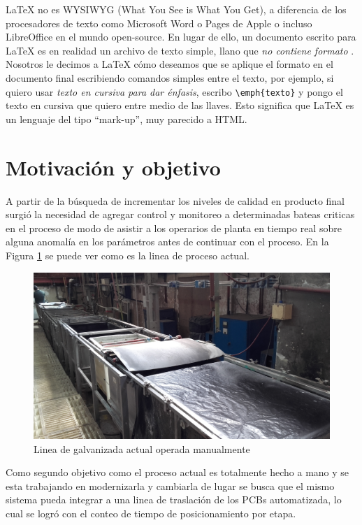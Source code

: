 \LaTeX{} no es \textsc{WYSIWYG} (What You See is What You Get), a diferencia de los procesadores de texto como Microsoft Word o Pages de Apple o incluso LibreOffice en el mundo open-source. En lugar de ello, un documento escrito para \LaTeX{} es en realidad un archivo de texto simple, llano que \emph{no contiene formato} . Nosotros le decimos a \LaTeX{} cómo deseamos que se aplique el formato en el documento final escribiendo comandos simples entre el texto, por ejemplo, si quiero usar \emph{texto en cursiva para dar énfasis}, escribo \verb|\emph{texto}| y pongo el texto en cursiva que quiero entre medio de las llaves. Esto significa que \LaTeX{} es un lenguaje del tipo \enquote{mark-up}, muy parecido a HTML.

\section{Motivación y objetivo}

A partir de la búsqueda de incrementar los niveles de calidad en producto final surgió la necesidad de agregar control y monitoreo a determinadas bateas criticas en el proceso de modo de asistir a los operarios de planta en tiempo real sobre alguna anomalía en los parámetros antes de continuar con el proceso. En la Figura \ref{fig:planta_actual} se puede ver como es la linea de proceso actual.

\begin{figure}[h]
	\centering
	\includegraphics[width=.8\textwidth]{Figures/planta_actual}
	\caption{Linea de galvanizada actual operada manualmente}
	\label{fig:planta_actual}
\end{figure}

Como segundo objetivo como el proceso actual es totalmente hecho a mano y se esta trabajando en modernizarla y cambiarla de lugar se busca que el mismo sistema pueda integrar a una linea de traslación de los PCBs automatizada, lo cual se logró con el conteo de tiempo de posicionamiento por etapa.  

